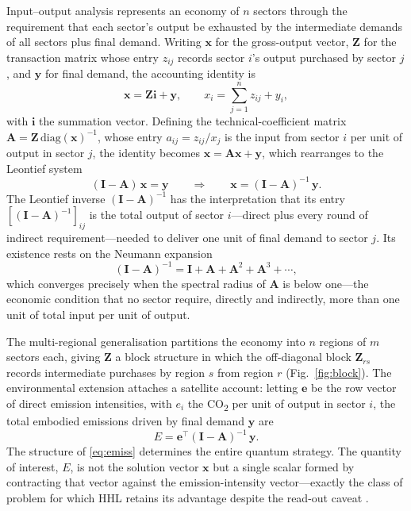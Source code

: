 \documentclass[letterpaper, 10 pt, conference]{ieeeconf}
\newcommand{\IO}{(\mathbf{I}-\mathbf{A})}
\newcommand{\IOn}{(\mathbf{I}-\mathbf{A})^{-1}}
\newcommand{\COO}{CO\textsubscript{2}}
\begin{document}
Input--output analysis represents an economy of $n$ sectors through the requirement that each sector's output be exhausted by the intermediate demands of all sectors plus final demand. Writing $\mathbf{x}$ for the gross-output vector, $\mathbf{Z}$ for the transaction matrix whose entry $z_{ij}$ records sector $i$'s output purchased by sector $j$, and $\mathbf{y}$ for final demand, the accounting identity is
\begin{equation}
\mathbf{x} = \mathbf{Z}\mathbf{i} + \mathbf{y},
\qquad
x_i = \sum_{j=1}^{n} z_{ij} + y_i,
\end{equation}
with $\mathbf{i}$ the summation vector. Defining the technical-coefficient matrix $\mathbf{A} = \mathbf{Z}\,\mathrm{diag}(\mathbf{x})^{-1}$, whose entry $a_{ij}=z_{ij}/x_j$ is the input from sector $i$ per unit of output in sector $j$, the identity becomes $\mathbf{x}=\mathbf{A}\mathbf{x}+\mathbf{y}$, which rearranges to the Leontief system
\begin{equation}
\IO\,\mathbf{x} = \mathbf{y}
\qquad\Longrightarrow\qquad
\mathbf{x} = \IOn\,\mathbf{y}.
\end{equation}
The Leontief inverse $\IOn$ has the interpretation that its entry $[\IOn]_{ij}$ is the total output of sector $i$---direct plus every round of indirect requirement---needed to deliver one unit of final demand to sector $j$. Its existence rests on the Neumann expansion
\begin{equation}
\IOn = \mathbf{I} + \mathbf{A} + \mathbf{A}^2 + \mathbf{A}^3 + \cdots,
\end{equation}
which converges precisely when the spectral radius of $\mathbf{A}$ is below one---the economic condition that no sector require, directly and indirectly, more than one unit of total input per unit of output.\par

The multi-regional generalisation partitions the economy into $n$ regions of $m$ sectors each, giving $\mathbf{Z}$ a block structure in which the off-diagonal block $\mathbf{Z}_{rs}$ records intermediate purchases by region $s$ from region $r$ (Fig.~\ref{fig:block}). The environmental extension attaches a satellite account: letting $\mathbf{e}$ be the row vector of direct emission intensities, with $e_i$ the \COO{} per unit of output in sector $i$, the total embodied emissions driven by final demand $\mathbf{y}$ are
\begin{equation}
E = \mathbf{e}^{\top}\IOn\,\mathbf{y}.
\label{eq:emiss}
\end{equation}
The structure of \eqref{eq:emiss} determines the entire quantum strategy. The quantity of interest, $E$, is not the solution vector $\mathbf{x}$ but a single scalar formed by contracting that vector against the emission-intensity vector---exactly the class of problem for which HHL retains its advantage despite the read-out caveat \cite{aaronson2015}.
\end{document}
